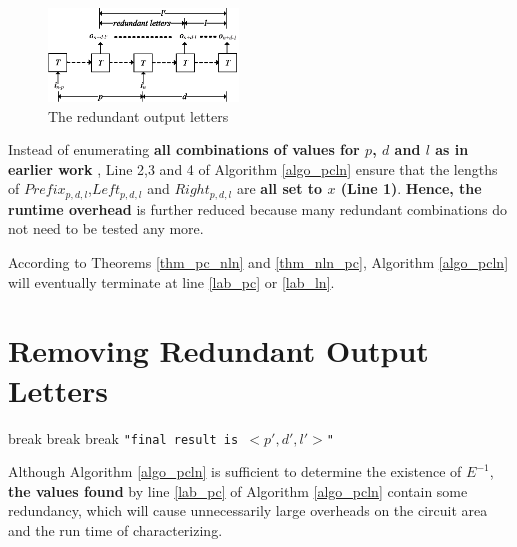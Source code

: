 \documentclass[journal]{IEEEtran}
\begin{document}
\begin{figure}[b]
\begin{center}
\includegraphics[width=0.45\textwidth]{rmred}
\end{center}
\caption{The redundant output letters}
  \label{fig_rmred}
\end{figure}

Instead of enumerating \textbf{all combinations of values for $p$, $d$ and $l$ as in earlier work} \cite{ShengYuShen:iccad09,ShengYuShen:tcad},
Line 2,3 and 4 of Algorithm \ref{algo_pcln} ensure that the lengths of $Prefix_{p,d,l}$,$Left_{p,d,l}$ and $Right_{p,d,l}$ are \textbf{all set to $x$ (Line 1)}.
\textbf{Hence,
the runtime overhead} is further reduced because many redundant combinations do not need to be tested any more.



According to Theorems \ref{thm_pc_nln} and \ref{thm_nln_pc},
Algorithm \ref{algo_pcln} will eventually terminate at line \ref{lab_pc} or \ref{lab_ln}.

\section{Removing Redundant Output Letters}\label{sec_rmred}
\begin{algorithm}
\caption{$RemoveRedundancy(p,d,l)$}
\label{algo_remove}
\begin{algorithmic}[1]
    \STATE break
  \ENDIF
\ENDFOR
{}
    \STATE break
  \ENDIF
\ENDFOR
{}
    \STATE break
  \ENDIF
\ENDFOR
\PRINT \texttt{"final result is $<p',d',l'>$"}
\end{algorithmic}
\end{algorithm}

Although Algorithm \ref{algo_pcln} is sufficient to determine the existence of $E^{-1}$,
\textbf{the values found} by line \ref{lab_pc} of Algorithm \ref{algo_pcln} contain some redundancy,
which will cause unnecessarily large overheads on the circuit area and the run time of characterizing.
\end{document}
